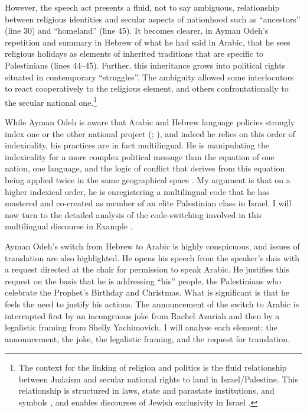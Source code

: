 \documentclass[output=paper,arabicfont]{langscibook}
\begin{document}
However, the speech act presents a fluid, not to say ambiguous, relationship between religious identities and secular aspects of nationhood such as “ancestors” (line 30) and “homeland” (line 45). It becomes clearer, in Ayman Odeh’s repetition and summary in Hebrew of what he had said in Arabic, that he sees religious holidays as elements of inherited traditions that are specific to Palestinians (lines 44–45). Further, this inheritance grows into political rights situated in contemporary “struggles”. The ambiguity allowed some interlocutors to react cooperatively to the religious element, and others confrontationally to the secular national one.\footnote{The context for the linking of religion and politics is the fluid relationship between Judaism and secular national rights to land in Israel/Palestine. This relationship is structured in laws, state and parastate institutions, and symbols \citep[86–101]{yadgar2020a}, and enables discourses of Jewish exclusivity in Israel \citep{rouhana2021a}.}

\hspace*{-3.5pt}While Ayman Odeh is aware that Arabic and Hebrew language policies strongly index one or the other national project (\citealt{rafael1994a}; \citealt[27]{suleiman2019a}), and indeed he relies on this order of indexicality, his practices are in fact multilingual. He is manipulating the indexicality for a more complex political message than the equation of one nation, one language, and the logic of conflict that derives from this equation being applied twice in the same geographical space \citep{suleiman2004a}. My argument is that on a higher indexical order, he is enregistering a multilingual code that he has mastered and co-created as member of an elite Palestinian class in Israel. I will now turn to the detailed analysis of the code-switching involved in this multilingual discourse in Example  .

Ayman Odeh’s switch from Hebrew to Arabic is highly conspicuous, and issues of translation are also highlighted. He opens his speech from the speaker’s dais with a request directed at the chair for permission to speak Arabic. He justifies this request on the basis that he is addressing “his” people, the Palestinians who celebrate the Prophet’s Birthday and Christmas. What is significant is that he feels the need to justify his actions. The announcement of the switch to Arabic is interrupted first by an incongruous joke from Rachel Azariah and then by a legalistic framing from Shelly Yachimovich. I will analyse each element: the announcement, the joke, the legalistic framing, and the request for translation. 
\end{document}
